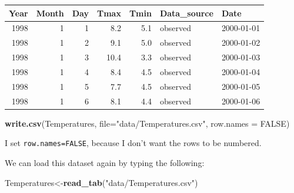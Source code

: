 \documentclass[
]{book}
\newenvironment{Shaded}{\begin{snugshade}}{\end{snugshade}}
\newcommand{\DataTypeTok}[1]{\textcolor[rgb]{0.13,0.29,0.53}{#1}}
\newcommand{\DecValTok}[1]{\textcolor[rgb]{0.00,0.00,0.81}{#1}}
\newcommand{\KeywordTok}[1]{\textcolor[rgb]{0.13,0.29,0.53}{\textbf{#1}}}
\newcommand{\NormalTok}[1]{#1}
\newcommand{\OperatorTok}[1]{\textcolor[rgb]{0.81,0.36,0.00}{\textbf{#1}}}
\newcommand{\OtherTok}[1]{\textcolor[rgb]{0.56,0.35,0.01}{#1}}
\newcommand{\StringTok}[1]{\textcolor[rgb]{0.31,0.60,0.02}{#1}}
\begin{document}
\begingroup\fontsize{10}{12}\selectfont

\begin{tabular}{r|r|r|r|r|l|l}
\hline
Year & Month & Day & Tmax & Tmin & Data\_source & Date\\
\hline
1998 & 1 & 1 & 8.2 & 5.1 & observed & 2000-01-01\\
\hline
1998 & 1 & 2 & 9.1 & 5.0 & observed & 2000-01-02\\
\hline
1998 & 1 & 3 & 10.4 & 3.3 & observed & 2000-01-03\\
\hline
1998 & 1 & 4 & 8.4 & 4.5 & observed & 2000-01-04\\
\hline
1998 & 1 & 5 & 7.7 & 4.5 & observed & 2000-01-05\\
\hline
1998 & 1 & 6 & 8.1 & 4.4 & observed & 2000-01-06\\
\hline
\end{tabular}
\endgroup{}

\begin{Shaded}
\begin{Highlighting}[]
\KeywordTok{write.csv}\NormalTok{(Temperatures, }\DataTypeTok{file=}\StringTok{"data/Temperatures.csv"}\NormalTok{, }\DataTypeTok{row.names =} \OtherTok{FALSE}\NormalTok{)}
\end{Highlighting}
\end{Shaded}

I set \texttt{row.names=FALSE}, because I don't want the rows to be numbered.

We can load this dataset again by typing the following:

\begin{Shaded}
\begin{Highlighting}[]
\NormalTok{Temperatures<-}\KeywordTok{read_tab}\NormalTok{(}\StringTok{"data/Temperatures.csv"}\NormalTok{)}
\end{Highlighting}
\end{Shaded}

\begin{Shaded}
\end{Shaded}

\begingroup\fontsize{10}{12}\selectfont
\end{document}
